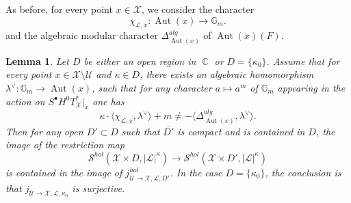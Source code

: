 \documentclass[12pt,reqno]{amsart}
\DeclareMathOperator\C{\mathbb C}
\newtheorem{lemma}[theorem]{Lemma}
\theoremstyle{definition}
\theoremstyle{remark}
\numberwithin{equation}{section}
\newcommand{\De}{\Delta}
\newcommand{\Aut}{\operatorname{Aut}}
\newcommand{\ot}{\otimes}
\renewcommand{\SS}{{\mathcal S}}
\newcommand{\LL}{{\mathcal L}}
\newcommand{\UU}{{\mathcal U}}
\newcommand{\sub}{\subset}
\newcommand{\ov}{\overline}
\newcommand{\la}{\lambda}
\newcommand{\G}{{\mathbb G}}
\newcommand{\lan}{\langle}
\newcommand{\ran}{\rangle}
\newcommand{\XX}{{\mathcal X}}
\newcommand{\fg}{{\mathfrak g}}
\begin{document}
As before, for every point $x\in \XX$, we consider
the character
$$\chi_{\LL,x}:\Aut(x)\to \G_m.$$
and the algebraic modular character $\De^{alg}_{\Aut(x)}$ of $\Aut(x)(F)$.

\begin{lemma}\label{surjective-lem}
Let $D$ be either an open region in $\C$ or $D=\{\kappa_0\}$.
Assume that for every point $x\in \XX\setminus \UU$ and $\kappa\in D$, 
there exists an algebraic homomorphism $\la^\vee:\G_m\to \Aut(x)$, such that for any character $a\mapsto a^m$ of $\G_m$ appearing in the action on $S^\bullet H^0T^*_{\XX}|_x$ one has
$$\kappa\cdot \lan \chi_{\LL,x},\la^\vee\ran+m\neq -\lan\De^{alg}_{\Aut(x)},\la^\vee\ran.$$
Then 
for any open $D'\sub D$ such that $\ov{D'}$ is compact and is contained in $D$,
the image of the restriction map
$$\SS^{hol}(\XX\times D,|\LL|^{\kappa})\to \SS^{hol}(\XX\times D',|\LL|^{\kappa})$$
is contained in the image of $j^{hol}_{\UU\to \XX,\LL,D'}$.
In the case $D=\{\kappa_0\}$, the conclusion is that $j_{\UU\to\XX,\LL,\kappa_0}$ is surjective.
\end{lemma}
\end{document}
